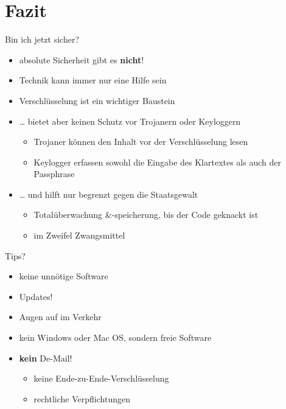 \section{Fazit}

\begin{frame}{Bin ich jetzt sicher?}
  \begin{itemize}[<+->]
    \item absolute Sicherheit gibt es \textbf{nicht}!
    \item Technik kann immer nur eine Hilfe sein
    \item Verschlüsselung ist ein wichtiger Baustein
    \item … bietet aber keinen Schutz vor Trojanern oder Keyloggern
      \begin{itemize}
	\item Trojaner können den Inhalt vor der Verschlüsselung lesen
	\item Keylogger erfassen sowohl die Eingabe des Klartextes als auch der
	  Passphrase
      \end{itemize}
    \item … und hilft nur begrenzt gegen die Staatsgewalt
      \begin{itemize}
	\item Totalüberwachung \&-speicherung, bis der Code geknackt ist
	\item im Zweifel Zwangsmittel
      \end{itemize}
  \end{itemize}

\end{frame}

\begin{frame}{Tips?}
  \begin{itemize}
    \item keine unnötige Software
    \item Updates!
    \item Augen auf im Verkehr
    \item kein Windows oder Mac OS, sondern freie Software
    \item \textbf{kein} De-Mail!
      \begin{itemize}
	\item keine Ende-zu-Ende-Verschlüsselung
	\item rechtliche Verpflichtungen
      \end{itemize}
  \end{itemize}

\end{frame}

